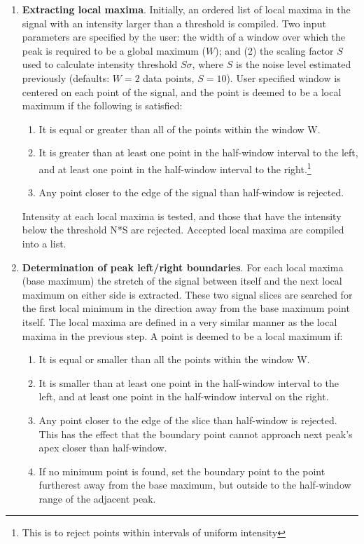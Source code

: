 \begin{enumerate}
\item {\bf Extracting local maxima}. Initially, an ordered list of
local maxima in the signal with an intensity larger than a threshold
is compiled. Two input parameters are specified by the user: the
width of a window over which the peak is required to be a global
maximum ($W$); and (2) the scaling factor $S$ used to calculate intensity
threshold $S \sigma$, where $S$ is the noise level estimated previously
(defaults: $W = 2$ data points, $S = 10$).  User specified window is
centered on each point of the signal, and the point is deemed
to be a local maximum if the following is satisfied:

   \begin{enumerate}
   \item It is equal or greater than all of the points within
         the window W.
   \item It is greater than at least one point in the half-window
         interval to the left, and at least one point in the
         half-window interval to the right.\footnote{This is
         to reject points within intervals of uniform intensity}
   \item Any point closer to the edge of the signal than half-window
         is rejected.
   \end{enumerate}

Intensity at each local maxima is tested, and those that have the
intensity below the threshold N*S are rejected. Accepted local
maxima are compiled into a list.

\item {\bf Determination of peak left/right boundaries}. For each
local maxima (base maximum) the stretch of the signal between itself
and the next local maximum on either side is extracted.  These
two signal slices are searched for the first local minimum in
the direction away from the base maximum point itself. The local
maxima are defined in a very similar manner as the local maxima
in the previous step.  A point is deemed to be a local maximum if:

   \begin{enumerate}
   \item It is equal or smaller than all the points within the
        window W.
   \item It is smaller than at least one point in the half-window
        interval to the left, and at least one point in the
        half-window interval on the right.
   \item Any point closer to the edge of the slice than half-window
        is rejected. This has the effect that the boundary point
        cannot approach next peak's apex closer than half-window.
   \item If no minimum point is found, set the boundary point to
        the point furtherest away from the base maximum, but
        outside to the half-window range of the adjacent peak.
   \end{enumerate}


\end{enumerate}
